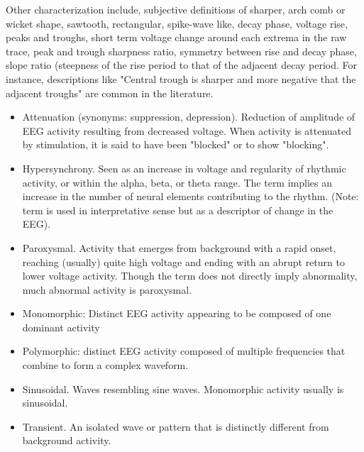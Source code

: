 \documentclass[sensors,article,submit,moreauthors,pdftex,10pt,a4paper]{mdpi}
\begin{document}
Other characterization include, subjective definitions of sharper, arch comb or wicket shape, sawtooth, rectangular, spike-wave like, decay phase, voltage rise, peaks and troughs, short term voltage change around each extrema in the raw trace, peak and trough sharpness ratio, symmetry between rise and decay phase, slope ratio (steepness of the rise period to that of the adjacent decay period.  For instance,  descriptions like "Central trough is sharper and more negative that the adjacent troughs" are common in the literature.

\begin{itemize}
\item Attenuation (synonyms: suppression, depression). Reduction of amplitude of EEG activity resulting from decreased voltage. When activity is attenuated by stimulation, it is said to have been "blocked" or to show "blocking".
\item Hypersynchrony. Seen as an increase in voltage and regularity of rhythmic activity, or within the alpha, beta, or theta range. The term implies an increase in the number of neural elements contributing to the rhythm. (Note: term is used in interpretative sense but as a descriptor of change in the EEG).
\item Paroxysmal. Activity that emerges from background with a rapid onset, reaching (usually) quite high voltage and ending with an abrupt return to lower voltage activity. Though the term does not directly imply abnormality, much abnormal activity is paroxysmal.
\end{itemize}

\begin{itemize}
\item Monomorphic: Distinct EEG activity appearing to be composed of one dominant activity
\item Polymorphic: distinct EEG activity composed of multiple frequencies that combine to form a complex waveform.
\item Sinusoidal. Waves resembling sine waves. Monomorphic activity usually is sinusoidal.
\item Transient. An isolated wave or pattern that is distinctly different from background activity.
\end{itemize}
\end{document}
